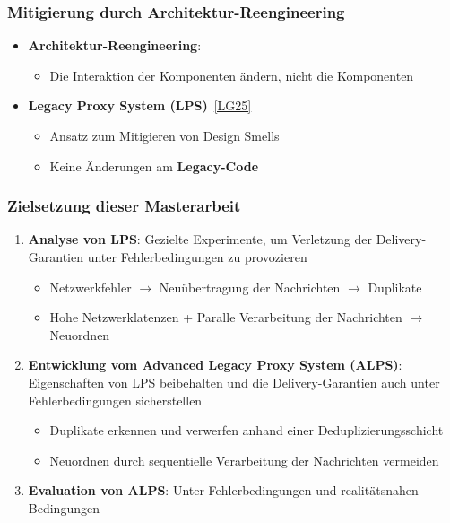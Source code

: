 \documentclass[11pt,aspectratio=1610]{beamer} %
\begin{document}
\begin{frame}
    \frametitle{Mitigierung durch Architektur-Reengineering}

    \begin{itemize}
        \item \textbf{Architektur-Reengineering}:
              \begin{itemize}
                  \item[] Die Interaktion der Komponenten ändern, nicht die Komponenten
              \end{itemize}
        \item \textbf{Legacy Proxy System (LPS)}~\hyperlink{LG25}{[LG25]}
              \begin{itemize}
                  \item Ansatz zum Mitigieren von Design Smells
                  \item Keine Änderungen am \textbf{Legacy-Code}
              \end{itemize}

    \end{itemize}
\end{frame}

\begin{frame}
    \frametitle{Zielsetzung dieser Masterarbeit}

    \begin{enumerate}
        \item \textbf{Analyse von LPS}: Gezielte Experimente, um Verletzung der Delivery-Garantien unter Fehlerbedingungen zu provozieren
              \begin{itemize}
                  \item Netzwerkfehler $\rightarrow$ Neuübertragung der Nachrichten $\rightarrow$ Duplikate
                  \item Hohe Netzwerklatenzen + Paralle Verarbeitung der Nachrichten $\rightarrow$ Neuordnen
              \end{itemize}
        \item \textbf{Entwicklung vom Advanced Legacy Proxy System (ALPS)}: Eigenschaften von LPS beibehalten und die Delivery-Garantien auch unter Fehlerbedingungen sicherstellen
              \begin{itemize}
                  \item Duplikate erkennen und verwerfen anhand einer Deduplizierungsschicht
                  \item Neuordnen durch sequentielle Verarbeitung der Nachrichten vermeiden
              \end{itemize}
        \item \textbf{Evaluation von ALPS}: Unter Fehlerbedingungen und realitätsnahen Bedingungen
    \end{enumerate}
\end{frame}
\end{document}
